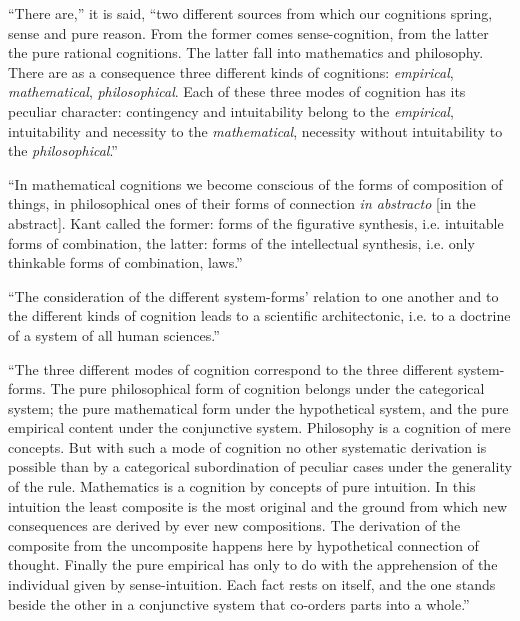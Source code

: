 \documentclass[12pt]{book}
\begin{document}
``There are,'' it is said, ``two different sources from which our cognitions spring, sense and
pure reason. From the former comes sense-cognition, from the latter the pure rational cognitions.
The latter fall into mathematics and philosophy. There are as a consequence three different kinds
of cognitions: \emph{empirical}, \emph{mathematical}, \emph{philosophical}. Each of these three
modes of cognition has its peculiar character: contingency and intuitability belong to the
\emph{empirical}, intuitability and necessity to the \emph{mathematical}, necessity without
intuitability to the \emph{philosophical}.''

``In mathematical cognitions we become conscious of the forms of composition of things, in
philosophical ones of their forms of
connection \textit{in abstracto} [in the abstract]. Kant called the former: forms of the figurative
synthesis, i.e. intuitable forms of combination, the latter: forms of the intellectual synthesis,
i.e. only thinkable forms of combination, laws.''

``The consideration of the different system-forms' relation to one another and to the different
kinds of cognition leads to a scientific architectonic, i.e. to a doctrine of a system of all
human sciences.''

``The three different modes of cognition correspond to the three different system-forms. The pure
philosophical form of cognition belongs under the categorical system; the pure mathematical form
under the hypothetical system, and the pure empirical content under the conjunctive system.
Philosophy is a cognition of mere concepts. But with such a mode of cognition no other systematic
derivation is possible than by a categorical subordination of peculiar cases under the generality
of the rule. Mathematics is a cognition by concepts of pure intuition. In this intuition the least
composite is the most original and the ground from which new consequences are derived by ever new
compositions. The derivation of the composite from the uncomposite happens here by hypothetical
connection of thought. Finally the pure empirical has only to do with the apprehension of the
individual given by sense-intuition. Each fact rests on itself, and the one stands beside the other
in a conjunctive system that co-orders parts into a whole.''
\end{document}
